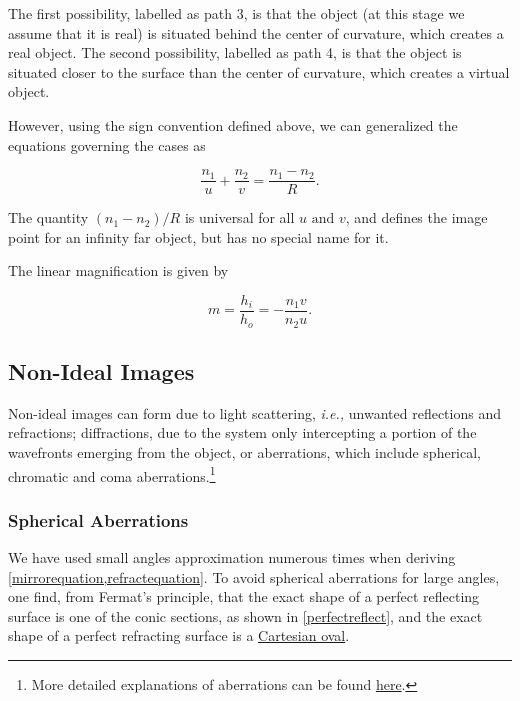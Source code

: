 \documentclass[english,a4paper,12pt]{report}
\begin{document}

The first possibility, labelled as path 3, is that the object (at this stage we assume that it is real) is situated behind the center of curvature, which creates a real object. The second possibility, labelled as path 4, is that the object is situated closer to the surface than the center of curvature, which creates a virtual object.

However, using the sign convention defined above, we can generalized the equations governing the cases as 

\begin{equation}
    \frac{n_1 }{u} + \frac{n_2 }{v} = \frac{n_1 - n_2 }{R}. \label{refractequation} 
\end{equation}

The quantity \((n_1 -n_2 )/R\) is universal for all \(u \text { and } v\), and defines the image point for an infinity far object, but has no special name for it.   

The linear magnification is given by 

\begin{equation}
    m = \frac{h_{i} }{h_{o} } = -\frac{n_1 v}{n_2 u}.  
\end{equation}

\subsection{Non-Ideal Images} \label{nonideal} 

Non-ideal images can form due to light scattering, \textit{i.e.,} unwanted reflections and refractions; diffractions, due to the system only intercepting a portion of the wavefronts emerging from the object, or aberrations, which include spherical, chromatic and coma aberrations.\footnote{More detailed explanations of aberrations can be found \href{http:////hyperphysics.phy-astr.gsu.edu//hbase//geoopt//aberrcon.html\#c1}{here}.} 

\subsubsection{Spherical Aberrations}

We have used small angles approximation numerous times when deriving \cref{mirrorequation,refractequation}. To avoid spherical aberrations for large angles, one find, from Fermat's principle, that the exact shape of a perfect reflecting surface is one of the conic sections, as shown in \cref{perfectreflect}, and the exact shape of a perfect refracting surface is a \href{https:////www.mathcurve.com//courbes2d.gb//descartes//descartes.shtml}{Cartesian oval}. 
\end{document}
